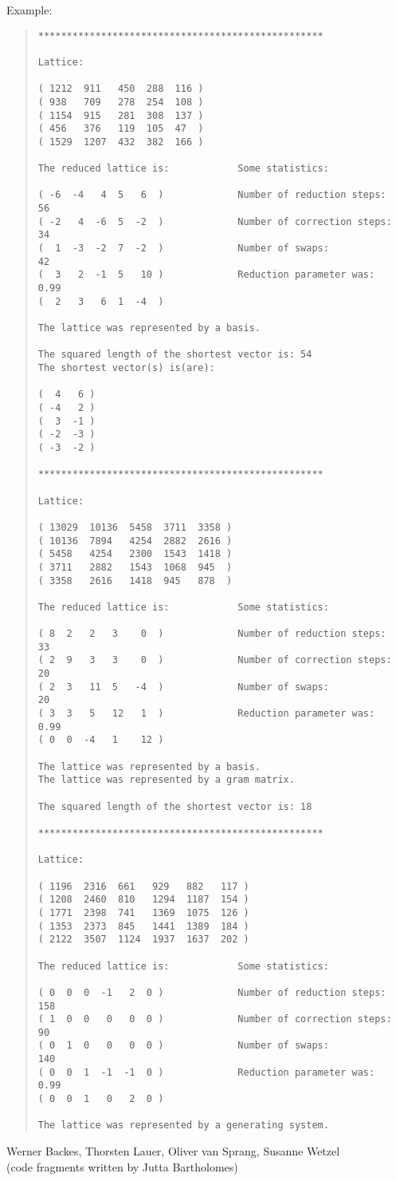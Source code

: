 Example:
\begin{quote}
\begin{verbatim}
**************************************************

Lattice:

( 1212  911   450  288  116 )
( 938   709   278  254  108 )
( 1154  915   281  308  137 )
( 456   376   119  105  47  )
( 1529  1207  432  382  166 )

The reduced lattice is:            Some statistics:

( -6  -4   4  5   6  )             Number of reduction steps:      56
( -2   4  -6  5  -2  )             Number of correction steps:     34
(  1  -3  -2  7  -2  )             Number of swaps:                42
(  3   2  -1  5   10 )             Reduction parameter was:        0.99
(  2   3   6  1  -4  )

The lattice was represented by a basis.

The squared length of the shortest vector is: 54
The shortest vector(s) is(are):

(  4   6 )
( -4   2 )
(  3  -1 )
( -2  -3 )
( -3  -2 )

**************************************************

Lattice:

( 13029  10136  5458  3711  3358 )
( 10136  7894   4254  2882  2616 )
( 5458   4254   2300  1543  1418 )
( 3711   2882   1543  1068  945  )
( 3358   2616   1418  945   878  )

The reduced lattice is:            Some statistics:

( 8  2   2   3    0  )             Number of reduction steps:      33
( 2  9   3   3    0  )             Number of correction steps:     20
( 2  3   11  5   -4  )             Number of swaps:                20
( 3  3   5   12   1  )             Reduction parameter was:        0.99
( 0  0  -4   1    12 )

The lattice was represented by a basis.
The lattice was represented by a gram matrix.

The squared length of the shortest vector is: 18

**************************************************

Lattice:

( 1196  2316  661   929   882   117 )
( 1208  2460  810   1294  1187  154 )
( 1771  2398  741   1369  1075  126 )
( 1353  2373  845   1441  1389  184 )
( 2122  3507  1124  1937  1637  202 )

The reduced lattice is:            Some statistics:

( 0  0  0  -1   2  0 )             Number of reduction steps:      158
( 1  0  0   0   0  0 )             Number of correction steps:     90
( 0  1  0   0   0  0 )             Number of swaps:                140
( 0  0  1  -1  -1  0 )             Reduction parameter was:        0.99
( 0  0  1   0   2  0 )

The lattice was represented by a generating system.
\end{verbatim}
\end{quote}



\AUTHOR

Werner Backes, Thorsten Lauer, Oliver van Sprang, Susanne Wetzel\\
(code fragments written by Jutta Bartholomes)
